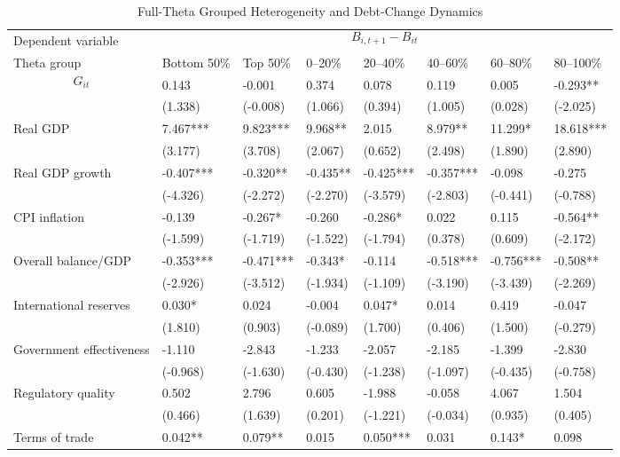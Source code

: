 \begin{table}[H]\centering
\begin{threeparttable}
\caption{Full-Theta Grouped Heterogeneity and Debt-Change Dynamics}
\label{tab:theta_group_heterogeneity_debt}
\scriptsize
\begin{tabularx}{\textwidth}{lYYYYYYY}
\toprule
Dependent variable &  \\
\cmidrule(lr){2-8}
Theta group & Bottom 50\% & Top 50\% & 0--20\% & 20--40\% & 40--60\% & 60--80\% & 80--100\% \\
\midrule
$$G_{it}$$ & 0.143 & -0.001 & 0.374 & 0.078 & 0.119 & 0.005 & -0.293** \\
  & (1.338) & (-0.008) & (1.066) & (0.394) & (1.005) & (0.028) & (-2.025) \\
Real GDP & 7.467*** & 9.823*** & 9.968** & 2.015 & 8.979** & 11.299* & 18.618*** \\
  & (3.177) & (3.708) & (2.067) & (0.652) & (2.498) & (1.890) & (2.890) \\
Real GDP growth & -0.407*** & -0.320** & -0.435** & -0.425*** & -0.357*** & -0.098 & -0.275 \\
  & (-4.326) & (-2.272) & (-2.270) & (-3.579) & (-2.803) & (-0.441) & (-0.788) \\
CPI inflation & -0.139 & -0.267* & -0.260 & -0.286* & 0.022 & 0.115 & -0.564** \\
  & (-1.599) & (-1.719) & (-1.522) & (-1.794) & (0.378) & (0.609) & (-2.172) \\
Overall balance/GDP & -0.353*** & -0.471*** & -0.343* & -0.114 & -0.518*** & -0.756*** & -0.508** \\
  & (-2.926) & (-3.512) & (-1.934) & (-1.109) & (-3.190) & (-3.439) & (-2.269) \\
International reserves & 0.030* & 0.024 & -0.004 & 0.047* & 0.014 & 0.419 & -0.047 \\
  & (1.810) & (0.903) & (-0.089) & (1.700) & (0.406) & (1.500) & (-0.279) \\
Government effectiveness & -1.110 & -2.843 & -1.233 & -2.057 & -2.185 & -1.399 & -2.830 \\
  & (-0.968) & (-1.630) & (-0.430) & (-1.238) & (-1.097) & (-0.435) & (-0.758) \\
Regulatory quality & 0.502 & 2.796 & 0.605 & -1.988 & -0.058 & 4.067 & 1.504 \\
  & (0.466) & (1.639) & (0.201) & (-1.221) & (-0.034) & (0.935) & (0.405) \\
Terms of trade & 0.042** & 0.079** & 0.015 & 0.050*** & 0.031 & 0.143* & 0.098 \\

\end{tabularx}
\end{threeparttable}
\end{table}
